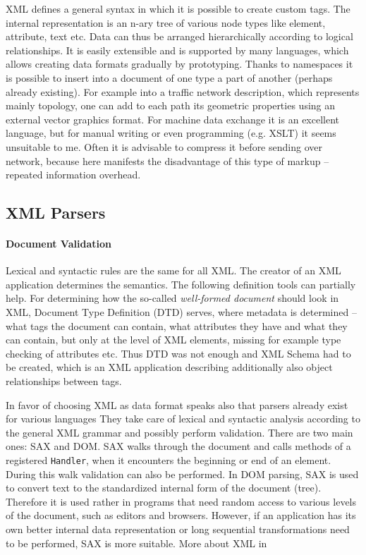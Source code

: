 \documentclass[english]{cls/fitthesis}
\newcommand{\cfr}[1]{\texttt{#1}}
\begin{document}
  XML defines a general syntax in which it is possible to create custom tags.
  The internal representation is an n-ary tree of various node types like element, attribute, text etc.
  Data can thus be arranged hierarchically according to logical relationships.
  It is easily extensible and is supported by many languages, which allows creating data formats gradually by prototyping.
  Thanks to namespaces it is possible to
  insert into a document of one type a part of another (perhaps already existing). For example into a traffic network description, which
  represents mainly topology, one can add to each path its geometric properties using an external vector
  graphics format. For machine data exchange it is an excellent language, but for manual writing or even programming
  (e.g. XSLT) it seems unsuitable to me. Often it is advisable to compress it before sending over network, because here manifests
  the disadvantage of this type of markup -- repeated information overhead.

  \subsection{XML Parsers}
  \paragraph{Document Validation} Lexical and syntactic rules are the same for all XML.
  The creator of an XML application determines the semantics. The following definition tools can partially help.
  For determining how the so-called \emph{well-formed document} should look
  in XML, Document Type Definition (DTD) serves,
  where metadata is determined -- what tags the document can contain, what attributes they have and what they can
  contain, but only at the level of XML elements, missing for example type checking of attributes etc.
  Thus DTD was not enough and XML Schema \cite{XMLSchema2004} had to be created,
  which is an XML application describing additionally also object relationships between tags.

  In favor of choosing XML as data format speaks also that
  parsers already exist for various languages
  They take care of lexical and syntactic
  analysis according to the general XML grammar and possibly perform validation.
  There are two main ones: SAX and DOM. SAX walks through the document and calls methods of a registered \cfr{Handler}, when
  it encounters the beginning or end of an element. During this walk validation can also be performed. In DOM parsing,
  SAX is used to convert text to the standardized internal form of the document (tree).
  Therefore it is used rather in programs
  that need random access to various levels of the document, such as editors and browsers. However, if an application has
  its own better internal data representation or long sequential transformations need to be performed, SAX is more suitable. More about XML in \cite{nutshellXML}
\end{document}
